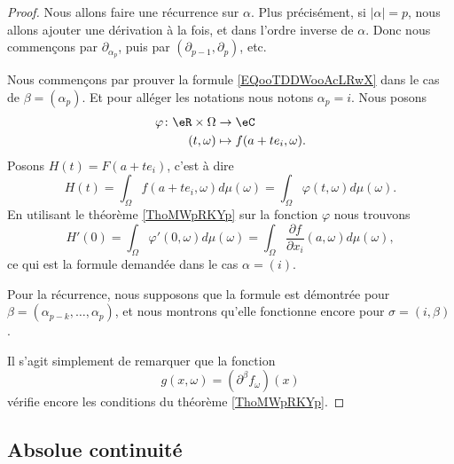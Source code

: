 \begin{proof}
    Nous allons faire une récurrence sur \( \alpha\). Plus précisément, si \( | \alpha |=p\), nous allons ajouter une dérivation à la fois, et dans l'ordre inverse de \( \alpha\). Donc nous commençons par \( \partial_{\alpha_p}\), puis par \( (\partial_{p-1}, \partial_p)\), etc.

    Nous commençons par prouver la formule \eqref{EQooTDDWooAcLRwX} dans le cas de \( \beta=(\alpha_p)\). Et pour alléger les notations nous notons \( \alpha_p=i\). Nous posons
    \begin{equation}
        \begin{aligned}
            \varphi\colon \eR\times \Omega&\to \eC \\
            (t,\omega)&\mapsto f(a+te_i,\omega). 
        \end{aligned}
    \end{equation}
    Posons \( H(t)=F(a+te_i)\), c'est à dire
    \begin{equation}
        H(t)=\int_{\Omega}f(a+te_i,\omega)d\mu(\omega)=\int_{\Omega}\varphi(t,\omega)d\mu(\omega).
    \end{equation}
    En utilisant le théorème \ref{ThoMWpRKYp} sur la fonction \( \varphi\) nous trouvons
    \begin{equation}
        H'(0)=\int_{\Omega}\varphi'(0,\omega)d\mu(\omega)=\int_{\Omega}\frac{ \partial f }{ \partial x_i }(a,\omega)d\mu(\omega),
    \end{equation}
    ce qui est la formule demandée dans le cas \( \alpha=(i)\).

    Pour la récurrence, nous supposons que la formule est démontrée pour \( \beta=(\alpha_{p-k},\ldots, \alpha_p)\), et nous montrons qu'elle fonctionne encore pour \( \sigma=(i, \beta)\).

    Il s'agit simplement de remarquer que la fonction
    \begin{equation}
        g(x,\omega)=(\partial^{\beta}f_{\omega})(x)
    \end{equation}
    vérifie encore les conditions du théorème \ref{ThoMWpRKYp}.
\end{proof}

\subsection{Absolue continuité}

